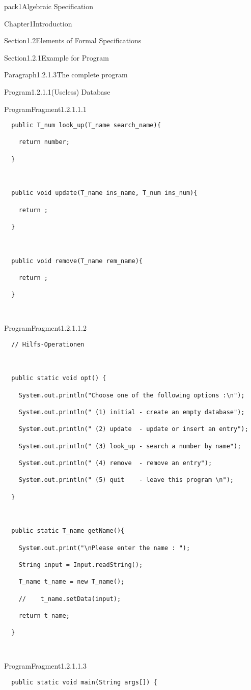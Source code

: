 \documentclass[landscape, slides, light]{mmiss2}
\begin{document}
\begin{Package}{pack1}{Algebraic
Specification}
\begin{Section}{Chapter1}{Introduction}
\begin{Section}{Section1.2}{Elements of Formal Specifications}{}
\begin{Section}{Section1.2.1}{Example for Program}{}
\begin{Paragraph}{Paragraph1.2.1.3}{The complete program}{}
\begin{Program}{Program1.2.1.1}{(Useless) Database}{}
\begin{ProgramFragment}{ProgramFragment1.2.1.1.1}{}{}
\begin{verbatim}
  public T_num look_up(T_name search_name){

    return number;

  }



  public void update(T_name ins_name, T_num ins_num){

    return ;

  }



  public void remove(T_name rem_name){

    return ;

  }



\end{verbatim}
\normalsize
\end{ProgramFragment}
\begin{ProgramFragment}{ProgramFragment1.2.1.1.2}{}{}
\tiny
\begin{verbatim}
  // Hilfs-Operationen



  public static void opt() {

    System.out.println("Choose one of the following options :\n");

    System.out.println(" (1) initial - create an empty database");

    System.out.println(" (2) update  - update or insert an entry");

    System.out.println(" (3) look_up - search a number by name");

    System.out.println(" (4) remove  - remove an entry");

    System.out.println(" (5) quit    - leave this program \n");

  }



  public static T_name getName(){

    System.out.print("\nPlease enter the name : ");

    String input = Input.readString();

    T_name t_name = new T_name();

    //    t_name.setData(input);

    return t_name;

  }



\end{verbatim}
\normalsize
\end{ProgramFragment}
\begin{ProgramFragment}{ProgramFragment1.2.1.1.3}{}{}
\tiny
\begin{verbatim}
  public static void main(String args[]) {


\end{verbatim}
\end{ProgramFragment}
\end{Program}
\end{Paragraph}
\end{Section}
\end{Section}
\end{Section}
\end{Package}
\end{document}
